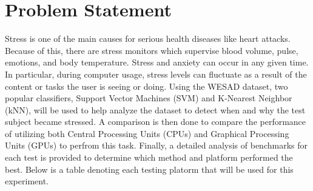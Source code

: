 \section{Problem Statement}
\label{sec:Problem-Statement}

Stress is one of the main causes for serious health diseases like heart attacks. 
Because of this, there are stress monitors which supervise  blood volume, pulse, emotions, and 
body temperature. Stress and anxiety can occur in any given time. In particular, during computer usage, stress levels 
can fluctuate as a result of the content or tasks the user is seeing or doing. Using the WESAD dataset, two popular 
classifiers, Support Vector Machines (SVM) and K-Nearest Neighbor (kNN), will be used to help analyze the dataset 
to detect when and why the test subject became stressed. 
A comparison is then done to compare the performance of utilizing both Central Processing Units (CPUs) and 
Graphical Processing Units (GPUs) to perfrom this task. 
Finally, a detailed analysis of benchmarks for each test is provided to determine which method and platform 
performed the best. Below is a table denoting each testing platorm that will be used for this experiment. 

